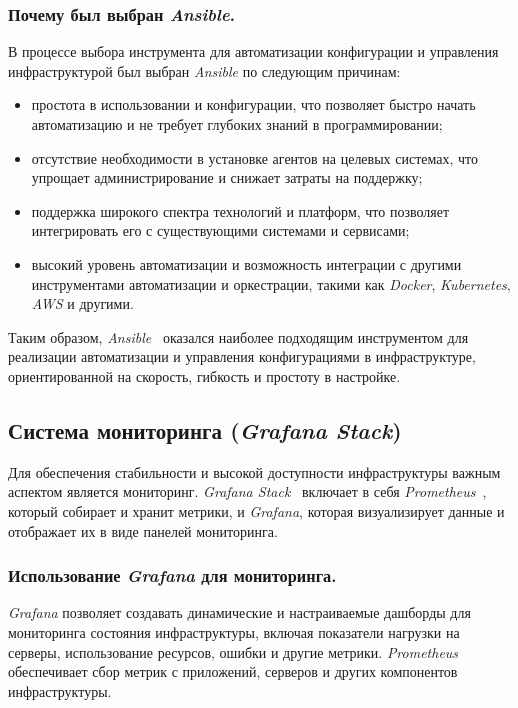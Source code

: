 \subsubsection{Почему был выбран \textit{Ansible}.}
В процессе выбора инструмента для автоматизации конфигурации и управления инфраструктурой был выбран \textit{Ansible} по следующим причинам:
\begin{itemize}
    \item простота в использовании и конфигурации, что позволяет быстро начать автоматизацию и не требует глубоких знаний в программировании;
    \item отсутствие необходимости в установке агентов на целевых системах, что упрощает администрирование и снижает затраты на поддержку;
    \item поддержка широкого спектра технологий и платформ, что позволяет интегрировать его с существующими системами и сервисами;
    \item высокий уровень автоматизации и возможность интеграции с другими инструментами автоматизации и оркестрации, такими как \textit{Docker}, \textit{Kubernetes}, \textit{AWS} и другими.
\end{itemize}

Таким образом, \textit{Ansible}~\cite{ansible} оказался наиболее подходящим инструментом для реализации автоматизации и управления конфигурациями в инфраструктуре, ориентированной на скорость, гибкость и простоту в настройке.

\subsection{Система мониторинга (\textit{Grafana Stack})}
\label{sec:monitoring}
Для обеспечения стабильности и высокой доступности инфраструктуры важным аспектом является мониторинг. \textit{Grafana Stack}~\cite{grafana} включает в себя \textit{Prometheus}~\cite{prometheus}, который собирает и хранит метрики, и \textit{Grafana}, которая визуализирует данные и отображает их в виде панелей мониторинга.

\subsubsection{Использование \textit{Grafana} для мониторинга.}
\textit{Grafana} позволяет создавать динамические и настраиваемые дашборды для мониторинга состояния инфраструктуры, включая показатели нагрузки на серверы, использование ресурсов, ошибки и другие метрики. \textit{Prometheus} обеспечивает сбор метрик с приложений, серверов и других компонентов инфраструктуры.

